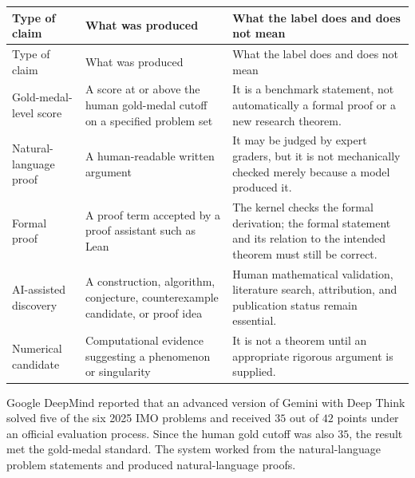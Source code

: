     {\small
    \renewcommand{\arraystretch}{1.2}
    \begin{longtable}{@{}L{0.23\textwidth}L{0.29\textwidth}L{0.40\textwidth}@{}}
        \toprule
        Type of claim & What was produced & What the label does and does not mean \\
        \midrule
        \endfirsthead

        \toprule
        Type of claim & What was produced & What the label does and does not mean \\
        \midrule
        \endhead

        \bottomrule
        \endlastfoot

        Gold-medal-level score
        & A score at or above the human gold-medal cutoff on a specified problem set
        & It is a benchmark statement, not automatically a formal proof or a new
          research theorem. \\

        Natural-language proof
        & A human-readable written argument
        & It may be judged by expert graders, but it is not mechanically checked
          merely because a model produced it. \\

        Formal proof
        & A proof term accepted by a proof assistant such as Lean
        & The kernel checks the formal derivation; the formal statement and its
          relation to the intended theorem must still be correct. \\

        AI-assisted discovery
        & A construction, algorithm, conjecture, counterexample candidate, or proof idea
        & Human mathematical validation, literature search, attribution, and
          publication status remain essential. \\

        Numerical candidate
        & Computational evidence suggesting a phenomenon or singularity
        & It is not a theorem until an appropriate rigorous argument is supplied. \\
    \end{longtable}
    }

    \begin{fact}
        Google DeepMind reported that an advanced version of Gemini with Deep
        Think solved five of the six 2025 IMO problems and received $35$ out of
        $42$ points under an official evaluation process. Since the human gold
        cutoff was also $35$, the result met the gold-medal standard. The system
        worked from the natural-language problem statements and produced
        natural-language proofs.
    \end{fact}

